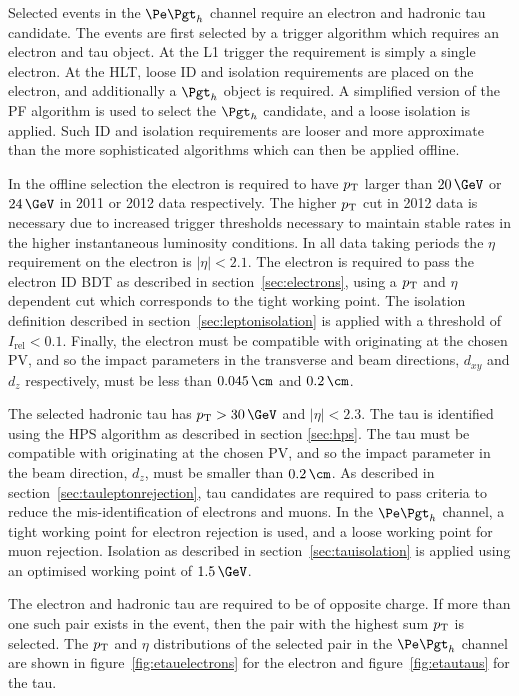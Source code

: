 Selected events in the $\etau$ channel require an electron and hadronic tau
candidate. The events are first selected by a trigger algorithm which requires
an electron and tau object. At the \ac{L1} trigger the requirement is simply a
single electron. At the \ac{HLT}, loose ID and isolation requirements are placed on the
electron, and additionally a $\Pgth$ object is required. A simplified version of
the \ac{PF} algorithm is used to select the $\Pgth$ candidate, and a loose
isolation is applied. Such ID and isolation requirements are looser and more approximate
than the more sophisticated algorithms which can then be applied offline.  

In the offline selection the electron is required to have $p_{\mathrm{T}}$ larger than $20\,\GeV$
or $24\,\GeV$ in 2011 or 2012 data respectively. The higher $p_{\mathrm{T}}$ cut in 2012 data is necessary
due to increased trigger thresholds necessary to maintain stable rates in the
higher instantaneous luminosity conditions. In all data taking periods the $\eta$ requirement
on the electron is $|\eta| < 2.1$. The electron is required to pass the electron
ID \ac{BDT} as described in section~\ref{sec:electrons}, using a $p_{\mathrm{T}}$ and
$\eta$ dependent cut which corresponds to the tight working point.  
The isolation definition described in section~\ref{sec:leptonisolation} is
applied with a threshold of $I_{\text{rel}} < 0.1$. Finally, the electron must be compatible with
originating at the chosen \ac{PV}, and so the impact parameters in the
transverse and beam directions, $d_{xy}$ and $d_{z}$ respectively, must be 
less than $0.045\,\cm$ and $0.2\,\cm$. 

The selected hadronic tau has $\pt > 30\,\GeV$ and $|\eta|<2.3$. 
The tau is identified using the \ac{HPS} algorithm as described in 
section \ref{sec:hps}. The tau must be compatible with
originating at the chosen \ac{PV}, and so the impact parameter in the beam
direction, $d_{z}$, must be smaller than $0.2\,\cm$. %
As described in section~\ref{sec:tauleptonrejection}, 
tau candidates are required to pass criteria to reduce the mis-identification of electrons and
muons. In the $\etau$ channel, a tight working point for electron rejection is
used, and a loose working point for muon rejection. Isolation as described in
section~\ref{sec:tauisolation} is applied using an optimised working point of
$1.5\,\GeV$.  

The electron and hadronic tau are required to be of opposite charge. If more
than one such pair exists in the event, then the pair with the highest sum $p_{\mathrm{T}}$
is selected. The $p_{\mathrm{T}}$ and $\eta$ distributions of the selected pair in the
$\etau$ channel are shown in figure~\ref{fig:etauelectrons} for the electron and
figure~\ref{fig:etautaus} for the tau. 


